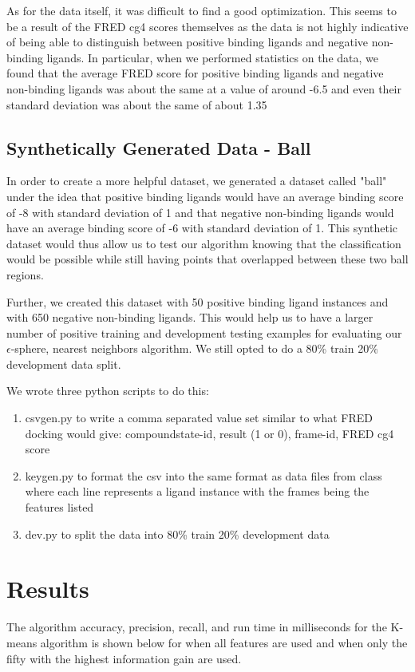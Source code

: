 \documentclass[11pt,letterpaper]{article}
\begin{document}
As for the data itself, it was difficult to find a good optimization.  This seems to be a result of the FRED cg4 scores themselves as the data is not highly indicative of being able to distinguish between positive binding ligands and negative non-binding ligands.  In particular, when we performed statistics on the data, we found that the average FRED score for positive binding ligands and negative non-binding ligands was about the same at a value of around -6.5 and even their standard deviation was about the same of about 1.35

\subsection{Synthetically Generated Data - Ball}
In order to create a more helpful dataset, we generated a dataset called "ball" under the idea that positive binding ligands would have an average binding score of -8 with standard deviation of 1 and that negative non-binding ligands would have an average binding score of -6 with standard deviation of 1.  This synthetic dataset would thus allow us to test our algorithm knowing that the classification would be possible while still having points that overlapped between these two ball regions.

Further, we created this dataset with 50 positive binding ligand instances and with 650 negative non-binding ligands.  This would help us to have a larger number of positive training and development testing examples for evaluating our $\epsilon$-sphere, nearest neighbors algorithm.  We still opted to do a 80\% train 20\% development data split.

We wrote three python scripts to do this: 

\begin{enumerate} 	
	\item csvgen.py to write a comma separated value set similar to what FRED docking would give: compoundstate-id, result (1 or 0), frame-id, FRED cg4 score
	\item keygen.py to format the csv into the same format as data files from class where each line represents a ligand instance with the frames being the features listed
	\item dev.py to split the data into 80\% train 20\% development data
\end{enumerate}

\section{Results}
The algorithm accuracy, precision, recall, and run time in milliseconds for the K-means algorithm is shown below for when all features are used and when only the fifty with the highest information gain are used.
\end{document}
